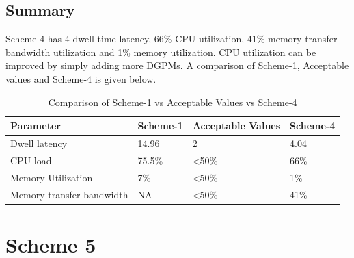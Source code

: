 \subsection{Summary}
\label{ss:mm:scheme4:summary}
Scheme-4 has 4 dwell time latency, 66\% CPU utilization, 41\% memory transfer bandwidth utilization and 1\% memory utilization. CPU utilization can be improved by simply adding more DGPMs. A comparison of Scheme-1, Acceptable values and Scheme-4 is given below.

\begin{table}[h!]
	\centering
	\begin{tabular}{|l|l|l|l|} 
	 \hline
	 \textbf{Parameter} & \textbf{Scheme-1} & \textbf{Acceptable Values} & \textbf{Scheme-4}\\
	 \hline
	 Dwell latency &  14.96 & 2 & 4.04 \\ \hline
	 CPU load & 75.5\% & \textless 50\% & 66\% \\ \hline
	 Memory Utilization & 7\% & \textless 50\%  & 1\% \\ \hline
	 Memory transfer bandwidth & NA & \textless 50\% & 41\%  \\ \hline
	\end{tabular}
	\caption{Comparison of Scheme-1 vs Acceptable Values vs Scheme-4}
	\label{tbl:mm:scheme4_comparison}
\end{table}


\section{Scheme 5}
\label{sec:mm:scheme5}

